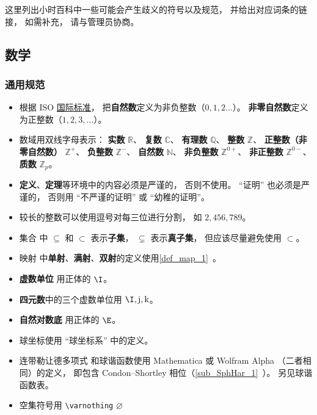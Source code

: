 
这里列出小时百科中一些可能会产生歧义的符号以及规范， 并给出对应词条的链接， 如需补充， 请与管理员协商。

\subsection{数学}
\subsubsection{通用规范}
\begin{itemize}
\item 根据 ISO \href{https://en.wikipedia.org/wiki/ISO/IEC_80000}{国际标准}， 把\textbf{自然数}定义为非负整数（$0,1,2\dots$）。 \textbf{非零自然数}定义为正整数（$1,2,3,\dots$）。
\item 数域用双线字母表示： \textbf{实数} $\mathbb R$、 \textbf{复数} $\mathbb C$、 \textbf{有理数} $\mathbb Q$、 \textbf{整数} $\mathbb Z$、 \textbf{正整数（非零自然数）} $\mathbb Z^+$、 \textbf{负整数} $\mathbb Z^-$、 \textbf{自然数} $\mathbb N$、 \textbf{非负整数} $\mathbb Z^{0+}$、 \textbf{非正整数} $\mathbb Z^{0-}$、 \textbf{质数} $\mathbb Z_p$。
\item \textbf{定义}、\textbf{定理}等环境中的内容必须是严谨的， 否则不使用。 “证明” 也必须是严谨的， 否则用 “不严谨的证明” 或 “幼稚的证明”。
\item 较长的整数可以使用逗号对每三位进行分割， 如 $2,456,789$。
\item 集合 中 $\subseteq$ 和 $\subset$ 表示\textbf{子集}， $\subsetneq$ 表示\textbf{真子集}， 但应该尽量避免使用 $\subset$。
\item 映射 中\textbf{单射}、\textbf{满射}、\textbf{双射}的定义使用\autoref{def_map_1}~。
\item \textbf{虚数单位} 用正体的 $\I$。
\item \textbf{四元数}中的三个虚数单位用 $\I, \mathrm{j}, \mathrm{k}$。
\item \textbf{自然对数底} 用正体的 $\E$。
\item 球坐标使用 “球坐标系” 中的定义。
\item 连带勒让德多项式 和球谐函数使用 Mathematica 或 Wolfram Alpha （二者相同）的定义， 即包含 Condon–Shortley 相位（\autoref{sub_SphHar_1}~）。 另见球谐函数表。
\item 空集符号用 \verb|\varnothing| $\varnothing$
\end{itemize}

